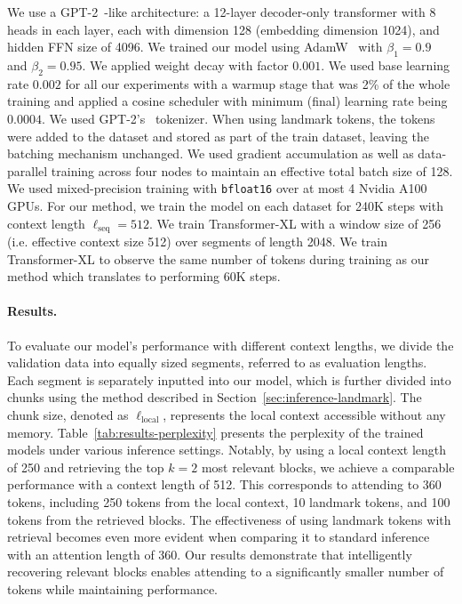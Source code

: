 We use a GPT-2~\cite{radford2019language}-like architecture: a 12-layer decoder-only transformer with 8 heads in each layer, each with dimension 128 (embedding dimension 1024), and hidden FFN size of 4096. We trained our model using AdamW~\cite{loshchilov_decoupled_2017} with $\beta_1 = 0 .9$ and $\beta_2 = 0.95$. We applied weight decay with factor $0.001$. We used base learning rate $0.002$ for all our experiments with a warmup stage that was 2\% of the whole training and applied a cosine scheduler with minimum (final) learning rate being $0.0004$. We used GPT-2's~\cite{radford2019language} tokenizer. When using landmark tokens, the tokens were added to the dataset and stored as part of the train dataset, leaving the batching mechanism unchanged. We used gradient accumulation as well as data-parallel training across four nodes to maintain an effective total batch size of 128. We used mixed-precision training with \texttt{bfloat16} over at most 4 Nvidia A100 GPUs. For our method, we train the model on each dataset for 240K steps with context length $\ell_{\text{seq}} = 512$. We train Transformer-XL with a window size of 256 (i.e. effective context size 512) over segments of length 2048. We train Transformer-XL to observe the same number of tokens during training as our method which translates to performing 60K steps.

\paragraph{Results.}

To evaluate our model's performance with different context lengths, we divide the validation data into equally sized segments, referred to as evaluation lengths. Each segment is separately inputted into our model, which is further divided into chunks using the method described in Section~\ref{sec:inference-landmark}. The chunk size, denoted as $\ell_{\text{local}}$, represents the local context accessible without any memory. Table~\ref{tab:results-perplexity} presents the perplexity of the trained models under various inference settings. Notably, by using a local context length of 250 and retrieving the top $k\!=\!2$ most relevant blocks, we achieve a comparable performance with a context length of 512. This corresponds to attending to 360 tokens, including 250 tokens from the local context, 10 landmark tokens, and 100 tokens from the retrieved blocks. The effectiveness of using landmark tokens with retrieval becomes even more evident when comparing it to standard inference with an attention length of 360. Our results demonstrate that intelligently recovering relevant blocks enables attending to a significantly smaller number of tokens while maintaining performance. 

